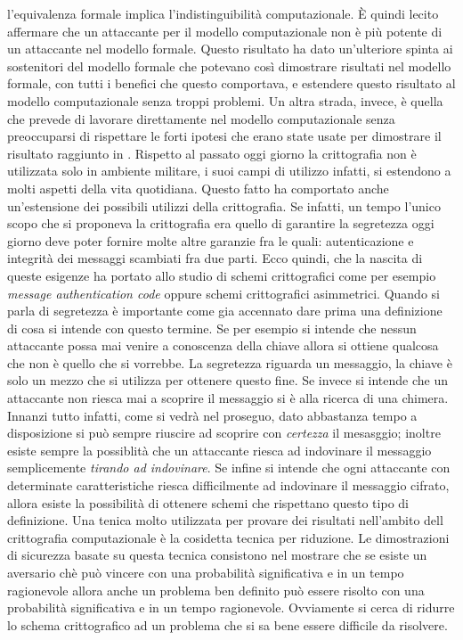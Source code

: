 \documentclass[a4paper,openright,twoside,12pt]{report}
\begin{document}
l'equivalenza formale implica l'indistinguibilit\`a computazionale.
\`E quindi lecito affermare che un attaccante per il modello computazionale non \`e pi\`u potente di un attaccante nel modello formale. Questo risultato ha dato un'ulteriore spinta
ai sostenitori del modello formale che potevano cos\`i dimostrare risultati nel modello formale, con tutti i benefici che questo comportava, 
e estendere questo risultato al modello computazionale senza troppi problemi.
Un altra strada, invece, \`e quella che prevede di lavorare direttamente nel modello computazionale senza preoccuparsi di rispettare le forti ipotesi che erano 
state usate per dimostrare il risultato raggiunto in \cite{DBLP:journals/joc/AbadiR07}.
Rispetto al passato oggi giorno la crittografia non \`e utilizzata solo in ambiente militare, i suoi campi di utilizzo infatti, si estendono a molti aspetti della vita quotidiana.
Questo fatto ha comportato anche un'estensione dei possibili utilizzi della crittografia. Se infatti, un tempo l'unico scopo che si proponeva la crittografia era quello di garantire
la segretezza oggi giorno deve poter fornire molte altre garanzie fra le quali: autenticazione e integrit\`a dei messaggi scambiati fra due parti. Ecco quindi, che la nascita di queste esigenze
ha portato allo studio di schemi crittografici come per esempio \emph{message authentication code} oppure schemi crittografici asimmetrici.
Quando si parla di segretezza \`e importante come gia accennato dare prima una definizione di cosa si intende con questo termine.
Se per esempio si intende che nessun attaccante possa mai venire a conoscenza della chiave allora si ottiene qualcosa che non \`e quello che si vorrebbe. La segretezza riguarda un messaggio, 
la chiave \`e solo un mezzo che si utilizza per ottenere questo fine. 
Se invece si intende che un attaccante non riesca mai a scoprire il messaggio si \`e alla ricerca di una chimera. Innanzi tutto infatti, come si vedr\`a nel proseguo, dato abbastanza
tempo a disposizione si pu\`o sempre riuscire ad scoprire con \emph{certezza} il mesasggio; inoltre esiste sempre la possiblit\`a che un attaccante riesca ad indovinare il messaggio
semplicemente \emph{tirando ad indovinare}. Se infine si intende che ogni attaccante con determinate caratteristiche riesca difficilmente ad indovinare il messaggio cifrato, allora esiste la 
possibilit\`a di ottenere schemi che rispettano questo tipo di definizione.
Una tenica molto utilizzata per provare dei risultati nell'ambito dell crittografia computazionale \`e la cosidetta tecnica per riduzione. 
Le dimostrazioni di sicurezza basate su questa tecnica consistono nel mostrare che se esiste un aversario ch\`e pu\`o vincere con una probabilit\`a significativa e in un
tempo ragionevole allora anche un problema ben definito pu\`o essere risolto con una probabilit\`a significativa e in un tempo ragionevole. Ovviamente si cerca di ridurre
lo schema crittografico ad un problema che si sa bene essere difficile da risolvere.
\end{document}
